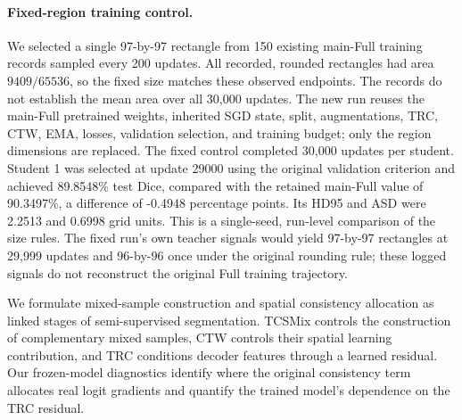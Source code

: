 \paragraph{Fixed-region training control.}
We selected a single 97-by-97 rectangle from 150 existing main-Full training records sampled every 200 updates. All recorded, rounded rectangles had area $9409/65536$, so the fixed size matches these observed endpoints. The records do not establish the mean area over all 30,000 updates. The new run reuses the main-Full pretrained weights, inherited SGD state, split, augmentations, TRC, CTW, EMA, losses, validation selection, and training budget; only the region dimensions are replaced.
The fixed control completed 30,000 updates per student. Student 1 was selected at update 29000 using the original validation criterion and achieved 89.8548\% test Dice, compared with the retained main-Full value of 90.3497\%, a difference of -0.4948 percentage points. Its HD95 and ASD were 2.2513 and 0.6998 grid units. This is a single-seed, run-level comparison of the size rules. The fixed run's own teacher signals would yield 97-by-97 rectangles at 29,999 updates and 96-by-96 once under the original rounding rule; these logged signals do not reconstruct the original Full training trajectory.

We formulate mixed-sample construction and spatial consistency allocation as linked stages of semi-supervised segmentation. TCSMix controls the construction of complementary mixed samples, CTW controls their spatial learning contribution, and TRC conditions decoder features through a learned residual. Our frozen-model diagnostics identify where the original consistency term allocates real logit gradients and quantify the trained model's dependence on the TRC residual.
    